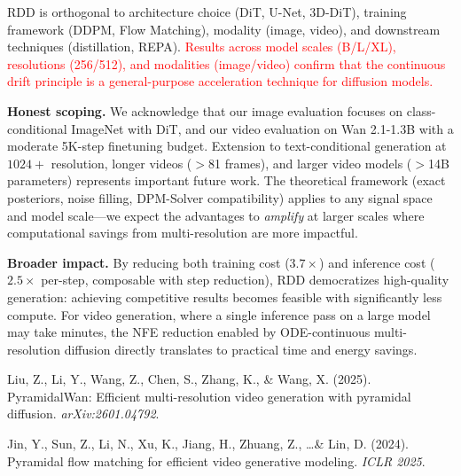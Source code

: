 RDD is orthogonal to architecture choice (DiT, U-Net, 3D-DiT), training framework (DDPM, Flow Matching), modality (image, video), and downstream techniques (distillation, REPA).
\textcolor{red}{Results across model scales (B/L/XL), resolutions (256/512), and modalities (image/video) confirm that the continuous drift principle is a general-purpose acceleration technique for diffusion models.}

\textbf{Honest scoping.}
We acknowledge that our image evaluation focuses on class-conditional ImageNet with DiT, and our video evaluation on Wan 2.1-1.3B with a moderate 5K-step finetuning budget.
Extension to text-conditional generation at $1024+$ resolution, longer videos ($>$81 frames), and larger video models ($>$14B parameters) represents important future work.
The theoretical framework (exact posteriors, noise filling, DPM-Solver compatibility) applies to any signal space and model scale---we expect the advantages to \emph{amplify} at larger scales where computational savings from multi-resolution are more impactful.

\textbf{Broader impact.}
By reducing both training cost ($3.7\times$) and inference cost ($2.5\times$ per-step, composable with step reduction), RDD democratizes high-quality generation: achieving competitive results becomes feasible with significantly less compute.
For video generation, where a single inference pass on a large model may take minutes, the NFE reduction enabled by ODE-continuous multi-resolution diffusion directly translates to practical time and energy savings.




Liu, Z., Li, Y., Wang, Z., Chen, S., Zhang, K., \& Wang, X. (2025).
\newblock PyramidalWan: Efficient multi-resolution video generation with pyramidal diffusion.
\newblock \emph{arXiv:2601.04792}.

Jin, Y., Sun, Z., Li, N., Xu, K., Jiang, H., Zhuang, Z., \ldots \& Lin, D. (2024).
\newblock Pyramidal flow matching for efficient video generative modeling.
\newblock \emph{ICLR 2025}.

